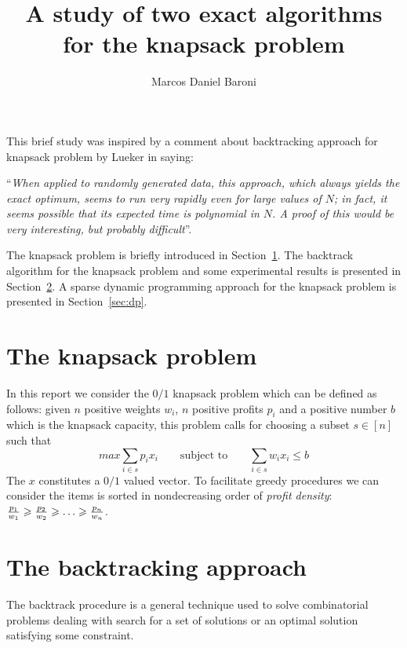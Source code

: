 \documentclass{article}
\title{A study of two exact algorithms for the knapsack problem}
\author{Marcos Daniel Baroni}
\begin{document}
\maketitle

This brief study was inspired by a comment about backtracking approach for knapsack problem
by Lueker in \cite{lueker1982average} 
saying:

\vspace*{10pt}
\begin{minipage}{5in}
``{\it When applied to randomly generated data, this approach, which always yields the
exact optimum, seems to run very rapidly even for large values of $N$; in fact,
it seems possible that its expected time is polynomial in $N$. A proof of this
would be very interesting, but probably difficult}''.
\end{minipage}
\vspace*{10pt}

The knapsack problem is briefly introduced in Section~\ref{sec:kp}.
The backtrack algorithm for the knapsack problem and some experimental results
is presented in Section~\ref{sec:backtrack}.
A sparse dynamic programming approach for the knapsack problem is presented in
Section~\ref{sec:dp}.

\section{The knapsack problem}
\label{sec:kp}

In this report we consider the $0/1$ knapsack problem which can be defined as follows:
given $n$ positive weights $w_i$, $n$ positive profits $p_i$ and a positive
number $b$ which is the knapsack capacity, this problem calls for choosing a
subset $s \in [n]$ such that
\begin{displaymath}
  max \sum_{i \in s} p_i x_i \qquad \text{subject to} \qquad
  \sum_{i \in s} w_i x_i \leqslant b
\end{displaymath}
The $x$ constitutes a $0/1$ valued vector.
To facilitate greedy procedures we can consider the items is sorted in
nondecreasing order of {\it profit density}:
  ${p_1 \over w_1} \geqslant {p_2 \over w_2} \geqslant \ldots \geqslant {p_n \over w_n}$.

\section{The backtracking approach}
\label{sec:backtrack}
The backtrack procedure is a general technique used to solve combinatorial
problems dealing with search for a set of solutions or an optimal
solution satisfying some constraint.
\end{document}
